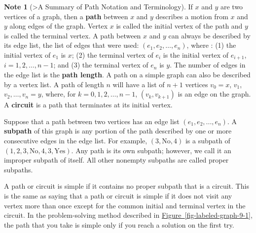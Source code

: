 \documentclass[10pt,]{book}
\newcommand{\terminology}[1]{\textbf{#1}}
\theoremstyle{plain}
\theoremstyle{definition}
\theoremstyle{definition}
\newtheorem{note}[theorem]{Note}
\theoremstyle{definition}
\theoremstyle{definition}
\theoremstyle{definition}
\numberwithin{equation}{section}
\begin{document}
\begin{note}[>A Summary of Path Notation and Terminology]\label{note-2}
If \(x\) and \(y\) are two vertices of a graph, then a \terminology{path} between \(x\) and \(y\) describes a motion from \(x\) and
\(y\) along edges of the graph. Vertex \(x\) is called the initial vertex of the path and \(y\) is called the terminal vertex.
A path between \(x\) and \(y\) can always be described by its  edge list, the list of edges that were used: \(\left(e_1, e_2,
\ldots , e_n\right)\), where : (1) the initial vertex of \(e_1\) is \(x\); (2) the terminal vertex of \(e_i\) is the initial vertex of \(e_{i+1}\), \(i = 1, 2, \ldots , n - 1\); and (3) the terminal vertex of \(e_n\) is \(y\). The number of edges in the edge list is the \terminology{path length}. A path on a simple graph can also be described by a vertex list. A path of length \(n\) will have a list of \(n + 1\) vertices
\(v_0=x\), \(v_1\), \(v_2,\ldots ,v_n=y\), where, for \(k = 0,1,2,\ldots , n-1\), \(\left(v_k,v_{k+1}\right)\) is an edge on the graph. A \terminology{
circuit} is a path that terminates at its initial vertex.%
\par
Suppose that a path between two vertices has an edge list \((e_1, e_2 , . . . ,e_n)\). A \terminology{subpath} of this graph is any portion of the path described by one or more consecutive edges in the edge list. For example, \((3, \textrm{No}, 4)\) is a subpath of \((1,2,3, \textrm{No}, 4, 3, \text{Yes})\).  Any path is its own subpath; however, we call it an improper subpath of itself. All other nonempty subpaths are called proper subpaths.%
\par
A path or circuit is  simple if it contains no proper subpath that is a circuit. This is the same as saying that a path or circuit is simple
if it does not visit any vertex more than once except for the common initial and terminal vertex in the circuit. In the problem-solving method described in \hyperref[fig-labeled-graph-9-1]{Figure~\ref{fig-labeled-graph-9-1}}, the path that you take is simple only if you reach a solution on the first try.%
\end{note}
\end{document}
